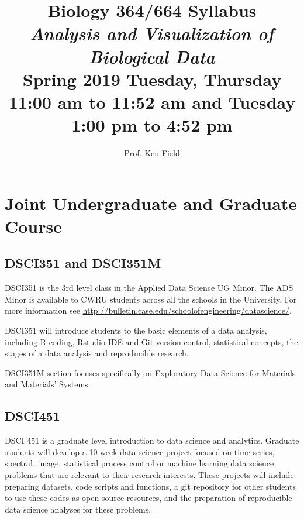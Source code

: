 \documentclass[11pt]{article} %
\title{Biology 364/664 Syllabus \\ \emph{Analysis and Visualization of Biological Data} \\ Spring 2019 	Tuesday, Thursday 11:00 am to 11:52 am	and Tuesday 1:00 pm to 4:52 pm}
\author{Prof. Ken Field}
\begin{document}
\maketitle


\section{Joint Undergraduate and Graduate Course}

  \subsection{DSCI351 and DSCI351M}
  
    DSCI351 is the 3rd level class in the Applied Data Science UG Minor. 
    The ADS Minor is available to CWRU students across all the schools in the University. 
    For more information see  \href{''http://bulletin.case.edu/schoolofengineering/datascience/''}{http://bulletin.case.edu/schoolofengineering/datascience/}. 
    
    DSCI351 will introduce students to the basic elements of a data analysis, including R coding, Rstudio IDE and Git version control, statistical concepts, the stages of a data analysis and reproducible research. 
    
    DSCI351M section focuses specifically on Exploratory Data Science for Materials and Materials' Systems. 

  \subsection{DSCI451}
  
    DSCI 451 is a graduate level introduction to data science and analytics. 
    Graduate students will develop a 10 week data science project focused on time-series, spectral, image, statistical process control or machine learning data science problems that are relevant to their research interests. 
    These projects will include preparing datasets, code scripts and functions, a git repository for other students to use these codes as open source resources, and the preparation of reproducible data science analyses for these problems. 
\end{document}
